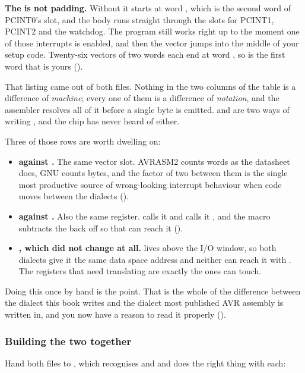 \textbf{The  is not padding.} Without it  starts at word ,
which is the second word of PCINT0's slot, and the body runs straight through the slots for
PCINT1, PCINT2 and the watchdog. The program still works right up to the moment one of those
interrupts is enabled, and then the vector jumps into the middle of your setup code. Twenty-six
vectors of two words each end at word , so  is the first word that is yours
().

That listing came out of both files. Nothing in the two columns of the table is a difference of
\emph{machine}; every one of them is a difference of \emph{notation}, and the assembler resolves all
of it before a single byte is emitted.  and 
are two ways of writing , and the chip has never heard of either.

Three of those rows are worth dwelling on:
\begin{itemize}
  \item \textbf{ against .} The same vector slot. AVRASM2
    counts words as the datasheet does, GNU  counts bytes, and the factor of two between
    them is the single most productive source of wrong-looking interrupt behaviour when code moves
    between the dialects ().
  \item \textbf{ against .} Also the same register.
     calls it  and  calls it , and the
    macro subtracts the  back off so that  can reach it
    ().
  \item \textbf{, which did not change at all.}  lives above the
    I/O window, so both dialects give it the same data space address and neither can reach it with
    . The registers that need translating are exactly the ones  can touch.
\end{itemize}

Doing this once by hand is the point. That is the whole of the difference between the dialect this
book writes and the dialect most published AVR assembly is written in, and you now have a reason to
read it properly ().

\subsubsection{Building the two together}
Hand both files to , which recognises  and  and does the right thing
with each:


